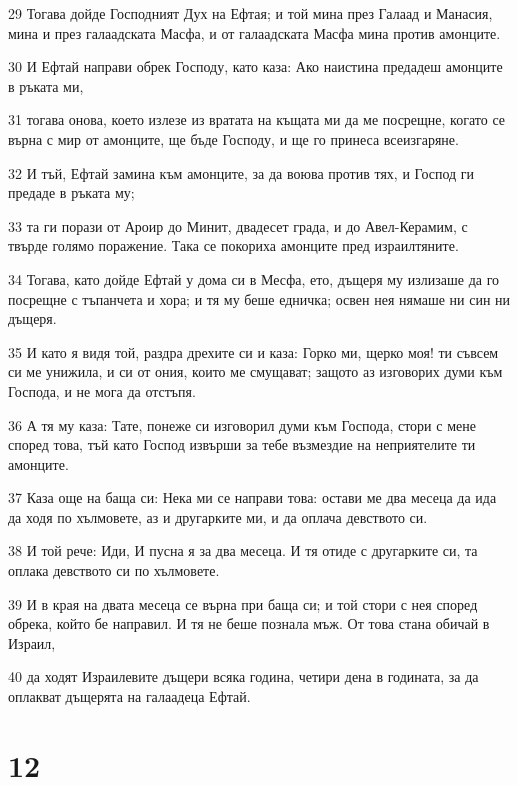 \par 29 Тогава дойде Господният Дух на Ефтая; и той мина през Галаад и Манасия, мина и през галаадската Масфа, и от галаадската Масфа мина против амонците.
\par 30 И Ефтай направи обрек Господу, като каза: Ако наистина предадеш амонците в ръката ми,
\par 31 тогава онова, което излезе из вратата на къщата ми да ме посрещне, когато се върна с мир от амонците, ще бъде Господу, и ще го принеса всеизгаряне.
\par 32 И тъй, Ефтай замина към амонците, за да воюва против тях, и Господ ги предаде в ръката му;
\par 33 та ги порази от Ароир до Минит, двадесет града, и до Авел-Керамим, с твърде голямо поражение. Така се покориха амонците пред израилтяните.
\par 34 Тогава, като дойде Ефтай у дома си в Месфа, ето, дъщеря му излизаше да го посрещне с тъпанчета и хора; и тя му беше едничка; освен нея нямаше ни син ни дъщеря.
\par 35 И като я видя той, раздра дрехите си и каза: Горко ми, щерко моя! ти съвсем си ме унижила, и си от ония, които ме смущават; защото аз изговорих думи към Господа, и не мога да отстъпя.
\par 36 А тя му каза: Тате, понеже си изговорил думи към Господа, стори с мене според това, тъй като Господ извърши за тебе възмездие на неприятелите ти амонците.
\par 37 Каза още на баща си: Нека ми се направи това: остави ме два месеца да ида да ходя по хълмовете, аз и другарките ми, и да оплача девството си.
\par 38 И той рече: Иди, И пусна я за два месеца. И тя отиде с другарките си, та оплака девството си по хълмовете.
\par 39 И в края на двата месеца се върна при баща си; и той стори с нея според обрека, който бе направил. И тя не беше познала мъж. От това стана обичай в Израил,
\par 40 да ходят Израилевите дъщери всяка година, четири дена в годината, за да оплакват дъщерята на галаадеца Ефтай.

\chapter{12}


